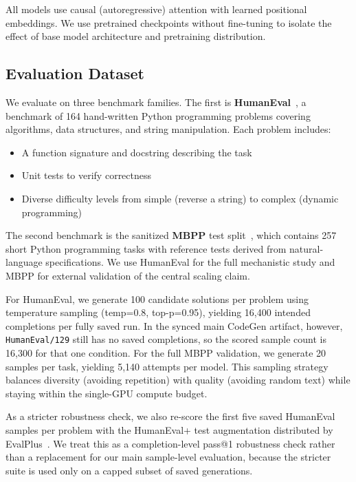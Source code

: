\documentclass[preprint,12pt,authoryear]{elsarticle}
\begin{document}
All models use causal (autoregressive) attention with learned positional embeddings. We use pretrained checkpoints without fine-tuning to isolate the effect of base model architecture and pretraining distribution.

\subsection{Evaluation Dataset}

We evaluate on three benchmark families. The first is \textbf{HumanEval}~\cite{chen2021humaneval}, a benchmark of 164 hand-written Python programming problems covering algorithms, data structures, and string manipulation. Each problem includes:

\begin{itemize}
\item A function signature and docstring describing the task
\item Unit tests to verify correctness
\item Diverse difficulty levels from simple (reverse a string) to complex (dynamic programming)
\end{itemize}

The second benchmark is the sanitized \textbf{MBPP} test split~\cite{austin2021program}, which contains 257 short Python programming tasks with reference tests derived from natural-language specifications. We use HumanEval for the full mechanistic study and MBPP for external validation of the central scaling claim.

For HumanEval, we generate 100 candidate solutions per problem using temperature sampling (temp=0.8, top-p=0.95), yielding 16,400 intended completions per fully saved run. In the synced main CodeGen artifact, however, \texttt{HumanEval/129} still has no saved completions, so the scored sample count is 16,300 for that one condition. For the full MBPP validation, we generate 20 samples per task, yielding 5,140 attempts per model. This sampling strategy balances diversity (avoiding repetition) with quality (avoiding random text) while staying within the single-GPU compute budget.

As a stricter robustness check, we also re-score the first five saved HumanEval samples per problem with the HumanEval+ test augmentation distributed by EvalPlus~\cite{liu2023evalplus}. We treat this as a completion-level pass@1 robustness check rather than a replacement for our main sample-level evaluation, because the stricter suite is used only on a capped subset of saved generations.
\end{document}
